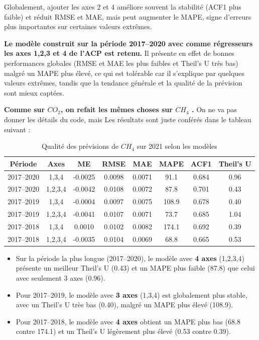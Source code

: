 \documentclass[a4paper,12pt]{report}%
\begin{document}
Globalement, ajouter les axes 2 et 4 améliore souvent la stabilité (ACF1 plus faible) et réduit RMSE et MAE, mais peut augmenter le MAPE, signe d’erreurs plus importantes sur certaines valeurs extrêmes.  

\textbf{Le modèle construit sur la période 2017–2020 avec comme régresseurs les axes 1,2,3 et 4 de l’ACP est retenu.}
Il présente en effet de bonnes performances globales (RMSE et MAE les plus faibles et Theil’s U très bas) malgré un MAPE plus élevé, ce qui est tolérable car il s’explique par quelques valeurs extrêmes, tandis que la tendance générale et la qualité de la prévision sont mieux captées.

\vspace{2em}
\textbf{ Comme sur $CO_2$, on refait les mêmes choses sur $CH_4$ .}
On ne va pas donner les détails du code, mais Les résultats sont juste conférés dans le tableau suivant :


\begin{table}[H]
\centering

\label{tab:accuracy_ch4}
\begin{tabular}{|c|c|c|c|c|c|c|c|}
\hline
\textbf{Période} & \textbf{Axes} & \textbf{ME} & \textbf{RMSE} & \textbf{MAE} & \textbf{MAPE} & \textbf{ACF1} & \textbf{Theil's U} \\
\hline
2017–2020 & 1,3,4 & -0.0025 & 0.0098 & 0.0071 & 91.1 & 0.684 & 0.96 \\
2017–2020 & 1,2,3,4 & -0.0042 & 0.0108 & 0.0072 & 87.8 & 0.701 & 0.43 \\
\hline
2017–2019 & 1,3,4 & -0.0004 & 0.0097 & 0.0075 & 108.9 & 0.678 & 0.40 \\
2017–2019 & 1,2,3,4 & -0.0041 & 0.0107 & 0.0071 & 73.7 & 0.685 & 1.04 \\
\hline
2017–2018 & 1,3,4 & 0.0010 & 0.0102 & 0.0082 & 174.1 & 0.692 & 0.39 \\
2017–2018 & 1,2,3,4 & -0.0035 & 0.0104 & 0.0069 & 68.8 & 0.665 & 0.53 \\
\hline
\end{tabular}
\caption{Qualité des prévisions de $CH_4$ sur 2021 selon les modèles}
\end{table}


\begin{itemize}
    \item Sur la période la plus longue (2017–2020), le modèle avec \textbf{4 axes} (1,2,3,4) présente un meilleur Theil's U (0.43) et un MAPE plus faible (87.8) que celui avec seulement 3 axes (0.96).
    \item Pour 2017–2019, le modèle avec \textbf{3 axes} (1,3,4) est globalement plus stable, avec un Theil's U très bas (0.40), malgré un MAPE plus élevé (108.9).
    \item Pour 2017–2018, le modèle avec \textbf{4 axes} obtient un MAPE plus bas (68.8 contre 174.1) et un Theil's U légèrement plus élevé (0.53 contre 0.39).
\end{itemize}
\end{document}
